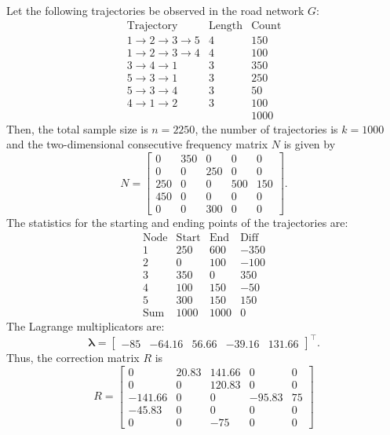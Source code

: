 \documentclass[b5paper,12pt]{report}
\theoremstyle{definition}
\newcommand{\blambda}{\boldsymbol{\lambda}}
\begin{document}
Let the following trajectories be observed in the road network $G$:
\[
\begin{array}{ccc} \textrm{Trajectory}&\textrm{Length}&\textrm{Count} \\ \hline 
1\rightarrow 2 \rightarrow 3 \rightarrow 5 &4&150 \\ 
1\rightarrow 2 \rightarrow 3 \rightarrow 4 &4&100 \\ 
3\rightarrow 4 \rightarrow 1 &3&350 \\
5\rightarrow 3 \rightarrow 1 &3&250 \\ 
5\rightarrow 3 \rightarrow 4 &3&50 \\ 
4\rightarrow 1 \rightarrow 2 &3&100 \\ \hline ~&~& 1000
\end{array}  
\] 
Then, the total sample size is $n=2250$, the number of trajectories is $k=1000$ and the two-dimensional consecutive frequency matrix $N$ is given by
\[
    N = \begin{bmatrix}  0&350&0&0&0 \\ 0&0&250&0&0 \\ 250&0&0&500&150 \\
    450&0&0&0&0 \\ 0&0&300&0&0 \end{bmatrix}.
\]
The statistics for the starting and ending points of the trajectories are:
\[
    \begin{array}{c|cc|c} \textrm{Node} &\textrm{Start} & \textrm{End} & \textrm{Diff} \\ \hline 1&250&600&-350 \\ 2&0&100&-100 \\ 3&350&0&350 \\
    4&100&150&-50 \\ 5&300&150&150 \\ \hline \textrm{Sum} & 1000&1000&0\end{array} 
\] 
The Lagrange multiplicators are:
\[
    \blambda = \begin{bmatrix} -85 &  -64.16 &  56.66 & -39.16 & 131.66 \end{bmatrix}^\top.
\]        
Thus, the correction matrix $R$ is
\[
    R = \begin{bmatrix}   0 &  20.83 & 141.66 & 0 & 0 \\ 0 & 0 & 120.83 &  0 &  0 \\
     -141.66  &  0 & 0 & -95.83 &  75  \\ -45.83 &  0 & 0 & 0 &  0 \\
     0  & 0 & -75 & 0 & 0  \end{bmatrix}
\]   
\end{document}
